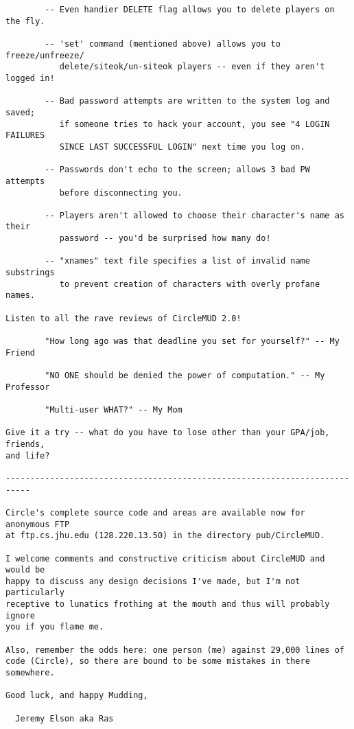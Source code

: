 \documentclass[11pt]{article}
\begin{document}
\begin{verbatim}
        -- Even handier DELETE flag allows you to delete players on the fly.

        -- 'set' command (mentioned above) allows you to freeze/unfreeze/
           delete/siteok/un-siteok players -- even if they aren't logged in!

        -- Bad password attempts are written to the system log and saved;
           if someone tries to hack your account, you see "4 LOGIN FAILURES
           SINCE LAST SUCCESSFUL LOGIN" next time you log on.

        -- Passwords don't echo to the screen; allows 3 bad PW attempts
           before disconnecting you.  

        -- Players aren't allowed to choose their character's name as their
           password -- you'd be surprised how many do!

        -- "xnames" text file specifies a list of invalid name substrings
           to prevent creation of characters with overly profane names.

Listen to all the rave reviews of CircleMUD 2.0!

        "How long ago was that deadline you set for yourself?" -- My Friend

        "NO ONE should be denied the power of computation." -- My Professor

        "Multi-user WHAT?" -- My Mom

Give it a try -- what do you have to lose other than your GPA/job, friends,
and life?

---------------------------------------------------------------------------

Circle's complete source code and areas are available now for anonymous FTP
at ftp.cs.jhu.edu (128.220.13.50) in the directory pub/CircleMUD.

I welcome comments and constructive criticism about CircleMUD and would be
happy to discuss any design decisions I've made, but I'm not particularly
receptive to lunatics frothing at the mouth and thus will probably ignore
you if you flame me.

Also, remember the odds here: one person (me) against 29,000 lines of
code (Circle), so there are bound to be some mistakes in there somewhere.

Good luck, and happy Mudding,

  Jeremy Elson aka Ras

\end{verbatim}
\end{document}
